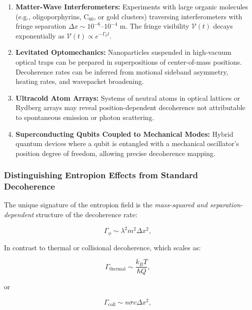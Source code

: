 \documentclass[12pt]{article}
\begin{document}
\begin{enumerate}
    \item \textbf{Matter-Wave Interferometers:} Experiments with large organic molecules (e.g., oligoporphyrins, C$_{60}$, or gold clusters) traversing interferometers with fringe separation $\Delta x \sim 10^{-6} \text{--} 10^{-4}$ m. The fringe visibility $\mathcal{V}(t)$ decays exponentially as $\mathcal{V}(t) \propto e^{-\Gamma_\phi t}$.

    \item \textbf{Levitated Optomechanics:} Nanoparticles suspended in high-vacuum optical traps can be prepared in superpositions of center-of-mass positions. Decoherence rates can be inferred from motional sideband asymmetry, heating rates, and wavepacket broadening.

    \item \textbf{Ultracold Atom Arrays:} Systems of neutral atoms in optical lattices or Rydberg arrays may reveal position-dependent decoherence not attributable to spontaneous emission or photon scattering.

    \item \textbf{Superconducting Qubits Coupled to Mechanical Modes:} Hybrid quantum devices where a qubit is entangled with a mechanical oscillator's position degree of freedom, allowing precise decoherence mapping.
\end{enumerate}

\subsubsection*{Distinguishing Entropion Effects from Standard Decoherence}

The unique signature of the entropion field is the \emph{mass-squared and separation-dependent} structure of the decoherence rate:

\begin{equation}
\Gamma_\phi \sim \lambda^2 m^2 \Delta x^2,
\label{eq:entropion_scaling_law}
\end{equation}

In contrast to thermal or collisional decoherence, which scales as:

\begin{equation}
\Gamma_{\mathrm{thermal}} \sim \frac{k_B T}{\hbar Q},
\end{equation}

or

\begin{equation}
\Gamma_{\mathrm{coll}} \sim n \sigma v \Delta x^2,
\end{equation}
\end{document}
